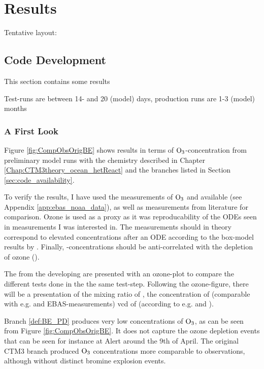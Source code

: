 \setcounter{chapter}{5}
\chapter{Results}\label{chap:results}

Tentative layout: 


\section{Code Development}\label{sec:results_code_development}

This section contains some results 

Test-runs are between 14- and 20 (model) days, production runs are 1-3 (model) months

\subsection{A First Look}

Figure \ref{fig:CompObsOrigBE} shows results in terms of $\mathrm{O_3}$-concentration from preliminary model runs with the chemistry described in Chapter \ref{Chap:CTM3theory_ocean_hetReact} and the branches listed in Section \ref{sec:code_availability}. 

\medskip

To verify the results, I have used the measurements of $\mathrm{O_3}$ and  available (see Appendix \ref{app:ebas_noaa_data}), as well as  measurements from literature for comparison. Ozone is used as a proxy as it was reproducability of the ODEs seen in measurements I was interested in. The  measurements should in theory correspond to elevated concentrations after an ODE according to the box-model results by \cite{CAO}. Finally, -concentrations should be anti-correlated with the depletion of ozone (\cite{barrie}). 

\medskip

The from the developing are presented with an ozone-plot to compare the different tests done in the the same test-step. Following the ozone-figure, there will be a presentation of the mixing ratio of , the concentration of  (comparable with e.g. \cite{barrie} and EBAS-measurements) \acrlong{vcd} of  (according to e.g. \cite{Peterson2015} and \cite{Simpson2017}).

\medskip

Branch \ref{def:BE_PD} produces very low concentrations of $\mathrm{O_3}$, as can be seen from Figure \ref{fig:CompObsOrigBE}. It does not capture the ozone depletion events that can be seen for instance at Alert around the 9th of April. The original CTM3 branch produced $\mathrm{O_3}$ concentrations more comparable to observations, although without distinct bromine explosion events. 

